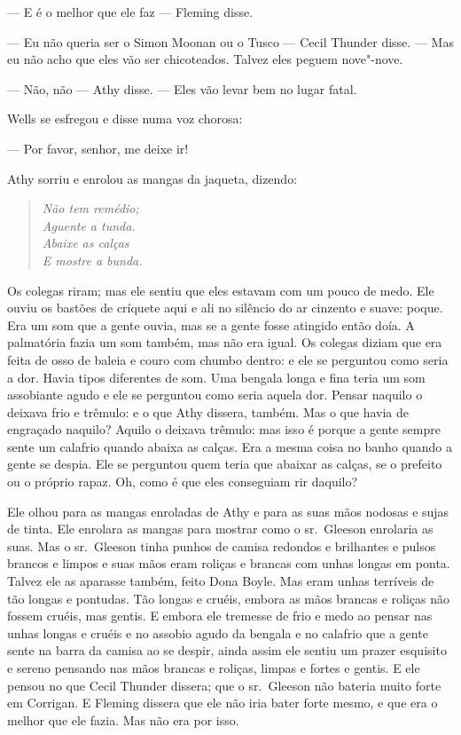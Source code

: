  --- E é o melhor que ele faz --- Fleming disse.

 --- Eu não queria ser o Simon Moonan ou o Tusco --- Cecil Thunder disse. --- Mas
eu não acho que eles vão ser chicoteados. Talvez eles peguem
nove"-nove.

 --- Não, não --- Athy disse. --- Eles vão levar bem no lugar fatal. 

Wells se esfregou e disse numa voz chorosa:

 --- Por favor, senhor, me deixe ir!

Athy sorriu e enrolou as mangas da jaqueta, dizendo:

\begin{verse}\itshape
Não tem remédio;\\
Aguente a tunda.\\
Abaixe as calças\\
E mostre a bunda.
\end{verse}

Os colegas riram; mas ele sentiu que eles estavam com um pouco de medo.
Ele ouviu os bastões de críquete aqui e ali no silêncio do ar cinzento
e suave: poque. Era um som que a gente ouvia, mas se a gente fosse
atingido então doía. A palmatória fazia um som também, mas não era
igual. Os colegas diziam que era feita de osso de baleia e couro com
chumbo dentro: e ele se perguntou como seria a dor. Havia tipos
diferentes de som. Uma bengala longa e fina teria um som assobiante
agudo e ele se perguntou como seria aquela dor. Pensar naquilo o
deixava frio e trêmulo: e o que Athy dissera, também. Mas o que havia
de engraçado naquilo? Aquilo o deixava trêmulo: mas isso é porque a gente
sempre sente um calafrio quando abaixa as calças. Era a mesma coisa no
banho quando a gente se despia. Ele se perguntou quem teria que abaixar
as calças, se o prefeito ou o próprio rapaz. Oh, como é que eles
conseguiam rir daquilo?

Ele olhou para as mangas enroladas de Athy e para as suas mãos nodosas e
sujas de tinta. Ele enrolara as mangas para mostrar como o sr.~Gleeson
enrolaria as suas. Mas o sr.~Gleeson tinha punhos de camisa redondos e
brilhantes e pulsos brancos e limpos e suas mãos eram roliças e brancas
com unhas longas em ponta. Talvez ele as aparasse também, feito Dona
Boyle. Mas eram unhas terríveis de tão longas e pontudas. Tão longas e
cruéis, embora as mãos brancas e roliças não fossem cruéis, mas gentis.
E embora ele tremesse de frio e medo ao pensar nas unhas longas e
cruéis e no assobio agudo da bengala e no calafrio que a gente sente na
barra da camisa ao se despir, ainda assim ele sentiu um prazer
esquisito e sereno pensando nas mãos brancas e roliças, limpas e fortes
e gentis. E ele pensou no que Cecil Thunder dissera; que o sr.~Gleeson
não bateria muito forte em Corrigan. E Fleming dissera que ele não iria
bater forte mesmo, e que era o melhor que ele fazia. Mas não era por
isso.

